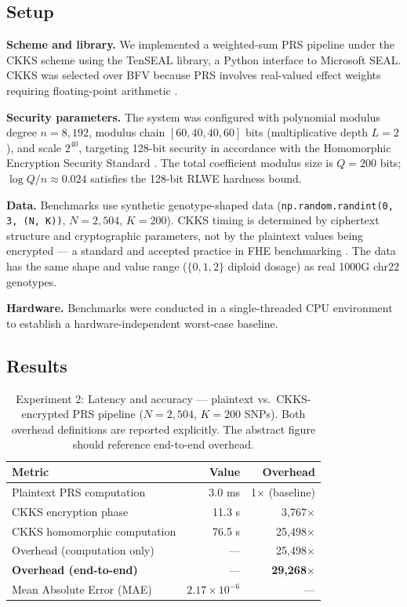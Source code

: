\documentclass[conference]{IEEEtran}
\begin{document}
\subsection{Setup}

\textbf{Scheme and library.} We implemented a weighted-sum PRS pipeline under
the CKKS scheme using the TenSEAL library, a Python interface to Microsoft
SEAL. CKKS was selected over BFV because PRS involves real-valued effect
weights requiring floating-point arithmetic \cite{cheon2017,lauter2015}.

\textbf{Security parameters.} The system was configured with polynomial modulus
degree $n=8{,}192$, modulus chain $[60,40,40,60]$ bits (multiplicative depth
$L=2$), and scale $2^{40}$, targeting 128-bit security in accordance with the
Homomorphic Encryption Security Standard \cite{cheon2019}. The total coefficient
modulus size is $Q=200$ bits; $\log Q/n\approx0.024$ satisfies the 128-bit
RLWE hardness bound.

\textbf{Data.} Benchmarks use synthetic genotype-shaped data
(\texttt{np.random.randint(0,\,3,\,(N,\,K))}, $N=2{,}504$, $K=200$). CKKS
timing is determined by ciphertext structure and cryptographic parameters, not
by the plaintext values being encrypted --- a standard and accepted practice in
FHE benchmarking \cite{cheon2019,blatt2020}. The data has the same shape and
value range ($\{0,1,2\}$ diploid dosage) as real 1000G chr22 genotypes.

\textbf{Hardware.} Benchmarks were conducted in a single-threaded CPU
environment to establish a hardware-independent worst-case baseline.

\subsection{Results}

\begin{table}[t]
\caption{Experiment 2: Latency and accuracy --- plaintext vs.\ CKKS-encrypted
PRS pipeline ($N=2{,}504$, $K=200$ SNPs). Both overhead definitions are
reported explicitly. The abstract figure should reference end-to-end overhead.}
\label{tab:exp2}
\begin{center}
\begin{tabular}{lrr}
\toprule
Metric & Value & Overhead \\
\midrule
Plaintext PRS computation     & 3.0 ms         & 1$\times$ (baseline) \\
CKKS encryption phase         & 11.3 s         & 3,767$\times$ \\
CKKS homomorphic computation  & 76.5 s         & 25,498$\times$ \\
\midrule
Overhead (computation only)   & ---            & 25,498$\times$ \\
\textbf{Overhead (end-to-end)} & ---           & \textbf{29,268$\times$} \\
\midrule
Mean Absolute Error (MAE)     & $2.17\times10^{-6}$ & --- \\
\bottomrule
\end{tabular}
\end{center}
\end{table}
\end{document}
